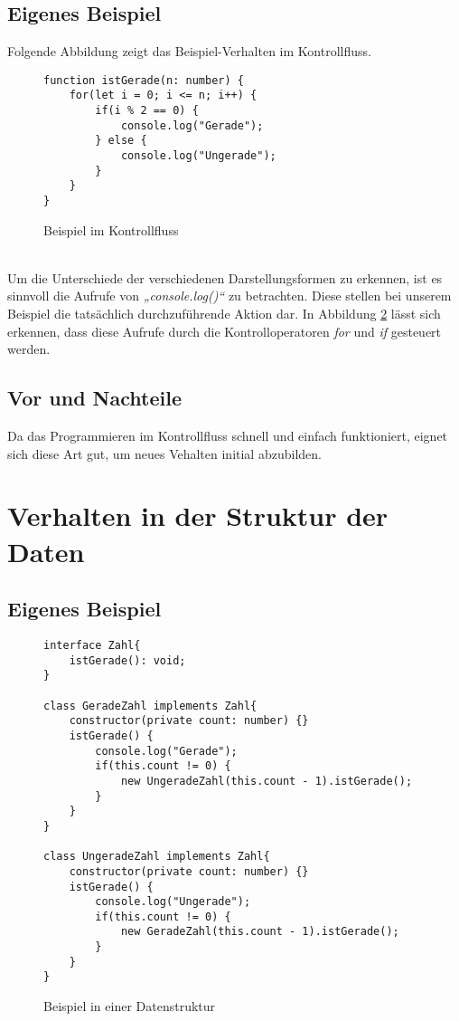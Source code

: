 \subsection{Eigenes Beispiel}
Folgende Abbildung zeigt das Beispiel-Verhalten im Kontrollfluss.
\begin{figure}[h]
    \centering
        \begin{verbatim}
function istGerade(n: number) {
    for(let i = 0; i <= n; i++) {
        if(i % 2 == 0) {
            console.log("Gerade");
        } else {
            console.log("Ungerade");
        }
    }
}
        \end{verbatim}
    \caption{Beispiel im Kontrollfluss}
    \label{fig:KontrollflussIstGerade}
\end{figure}\\
Um die Unterschiede der verschiedenen Darstellungsformen zu erkennen, ist es sinnvoll die Aufrufe von \textit{„console.log()“} zu betrachten. Diese stellen bei unserem Beispiel die tatsächlich durchzuführende Aktion dar. In Abbildung \ref{fig:KontrollflussIstGerade} lässt sich erkennen, dass diese Aufrufe durch die Kontrolloperatoren \textit{for} und \textit{if} gesteuert werden.
\subsection{Vor und Nachteile}
Da das Programmieren im Kontrollfluss schnell und einfach funktioniert, eignet sich diese Art gut, um neues Vehalten initial abzubilden. 
\section{Verhalten in der Struktur der Daten}
\subsection{Eigenes Beispiel}
\begin{figure}[ht]
    \centering
        \begin{verbatim}
interface Zahl{
    istGerade(): void;
}

class GeradeZahl implements Zahl{
    constructor(private count: number) {}
    istGerade() {
        console.log("Gerade");
        if(this.count != 0) {
            new UngeradeZahl(this.count - 1).istGerade();
        }
    }
}

class UngeradeZahl implements Zahl{
    constructor(private count: number) {}
    istGerade() {
        console.log("Ungerade");
        if(this.count != 0) {
            new GeradeZahl(this.count - 1).istGerade();
        }
    }
}
        \end{verbatim}
    \caption{Beispiel in einer Datenstruktur}
    \label{fig:KontrollflussIstGerade}
\end{figure}


